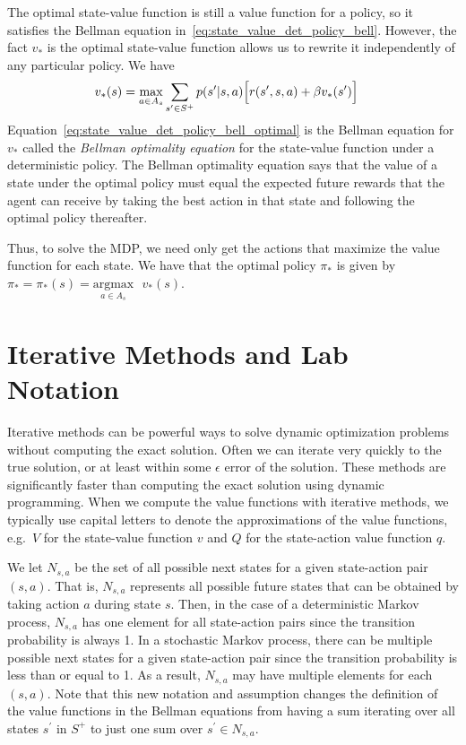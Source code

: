 The optimal state-value function is still a value function for a policy, so it satisfies the Bellman equation in\ \ref{eq:state_value_det_policy_bell}.
However, the fact $v_*$ is the optimal state-value function allows us to rewrite it independently of any particular policy.
We have
\begin{align}
    v_*(s) &= \max_{a\in A_s} \sum_{s^\prime\in S^+}p(s^\prime|s,a) \Bigl[r(s^\prime,s,a) + \beta v_*(s^\prime)\Bigr]
    \label{eq:state_value_det_policy_bell_optimal}
\end{align}
Equation\ \ref{eq:state_value_det_policy_bell_optimal} is the Bellman equation for $v_* $ called the \emph{Bellman optimality equation} for the state-value function under a deterministic policy.
The Bellman optimality equation says that the value of a state under the optimal policy must equal the expected future rewards that the agent can receive by taking the best action in that state and following the optimal policy thereafter.

Thus, to solve the MDP, we need only get the actions that maximize the value function for each state.
We have that the optimal policy $\pi_*$ is given by $\pi_*=\pi_*(s) = \underset{a\in A_s}{\text{argmax}}\text{ } v_*(s)$.


\section*{Iterative Methods and Lab Notation}
Iterative methods can be powerful ways to solve dynamic optimization problems without computing the exact solution.
Often we can iterate very quickly to the true solution, or at least within some $\epsilon$ error of the solution.
These methods are significantly faster than computing the exact solution using dynamic programming.
When we compute the value functions with iterative methods, we typically use capital letters to denote the approximations of the value functions, e.g.\ $V$ for the state-value function $v$ and $Q$ for the state-action value function $q$.

We let $N_{s,a}$ be the set of all possible next states for a given state-action pair $(s,a)$.
That is, $N_{s,a}$ represents all possible future states that can be obtained by taking action $a$ during state $s$.
Then, in the case of a deterministic Markov process, $N_{s,a}$ has one element for all state-action pairs since the transition probability is always 1.
In a stochastic Markov process, there can be multiple possible next states for a given state-action pair since the transition probability is less than or equal to 1.
As a result, $N_{s,a}$ may have multiple elements for each $(s,a)$.
Note that this new notation and assumption changes the definition of the value functions in the Bellman equations from having a sum iterating over all states $s^\prime$ in $S^+$ to just one sum over $s^\prime\in N_{s,a}$.


